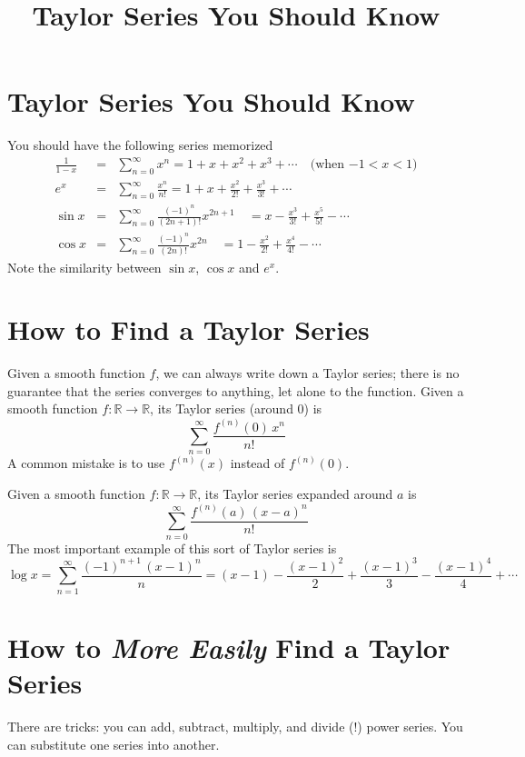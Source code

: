\documentclass[11pt]{article}
\title{Taylor Series You Should Know}
\newcommand{\R}{\mathbb{R}}
\begin{document}
\section*{Taylor Series You Should Know}

You should have the following series memorized
\begin{eqnarray*}
\frac{1}{1-x} &=& \sum^{\infty}_{n=0} x^n = 1 + x + x^2 + x^3 + \cdots \hspace{1em}(\mbox{when $-1 < x < 1$)} \\
e^{x} &=& \sum^{\infty}_{n=0} \frac{x^n}{n!} = 1 + x + \frac{x^2}{2!} + \frac{x^3}{3!} + \cdots \\
\sin x &=& \sum^{\infty}_{n=0} \frac{(-1)^n}{(2n+1)!} x^{2n+1}\quad =  x - \frac{x^3}{3!} + \frac{x^5}{5!} - \cdots \\
\cos x &=& \sum^{\infty}_{n=0} \frac{(-1)^n}{(2n)!} x^{2n}\quad =  1 - \frac{x^2}{2!} + \frac{x^4}{4!} - \cdots
\end{eqnarray*}
Note the similarity between $\sin x$, $\cos x$ and $e^x$.

\vfill

\section*{How to Find a Taylor Series}

Given a smooth function $f$, we can always write down a Taylor series;
there is no guarantee that the series converges to anything, let alone
to the function.  Given a smooth function $f : \R \to \R$, its Taylor
series (around $0$) is
$$
\sum_{n=0}^\infty \frac{f^{(n)}(0) \, x^n}{n!}
$$
A common mistake is to use $f^{(n)}(x)$ instead of $f^{(n)}(0)$.

Given a smooth function $f : \R \to \R$, its Taylor series expanded
around $a$ is
$$
\sum_{n=0}^\infty \frac{f^{(n)}(a) \, (x-a)^n}{n!}
$$
The most important example of this sort of Taylor series is
$$
\log x = \sum_{n=1}^\infty \frac{(-1)^{n+1} \, (x-1)^n}{n} = (x-1) - \frac{(x-1)^2}{2} + \frac{(x-1)^3}{3} - \frac{(x-1)^4}{4} + \cdots
$$

\vfill

\section*{How to \textit{More Easily} Find a Taylor Series}

There are tricks: you can add, subtract, multiply, and divide (!)
power series.  You can substitute one series into another.
\end{document}
